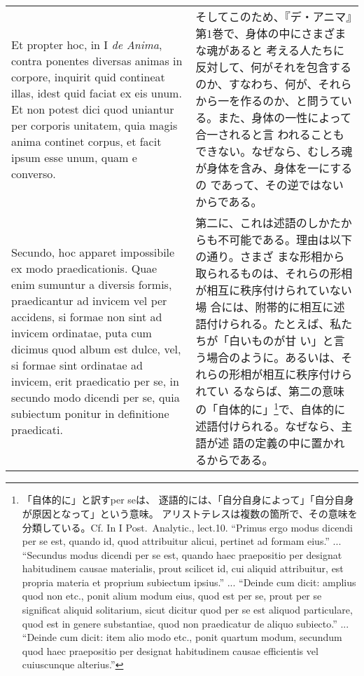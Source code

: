 \documentclass[paper=a4paper,fontsize=10pt,jafontsize=9pt,titlepage]{jlreq}
\begin{document}
\begin{longtable}{p{21em}p{21em}}
\\

 Et propter hoc, in I {\itshape de Anima}, contra ponentes diversas
animas in corpore, inquirit quid contineat illas, idest quid faciat ex
eis unum. Et non potest dici quod uniantur per corporis unitatem, quia
magis anima continet corpus, et facit ipsum esse unum, quam e
converso.

&

そしてこのため、『デ・アニマ』第1巻で、身体の中にさまざまな魂があると
考える人たちに反対して、何がそれを包含するのか、すなわち、何が、それら
から一を作るのか、と問うている。また、身体の一性によって合一されると言
われることもできない。なぜなら、むしろ魂が身体を含み、身体を一にするの
であって、その逆ではないからである。
 
\\

 Secundo, hoc apparet impossibile ex modo praedicationis. Quae enim
 sumuntur a diversis formis, praedicantur ad invicem vel per accidens,
 si formae non sint ad invicem ordinatae, puta cum dicimus quod album
 est dulce, vel, si formae sint ordinatae ad invicem, erit praedicatio
 per se, in secundo modo dicendi per se, quia subiectum ponitur in
 definitione praedicati.

&

第二に、これは述語のしかたからも不可能である。理由は以下の通り。さまざ
まな形相から取られるものは、それらの形相が相互に秩序付けられていない場
合には、附帯的に相互に述語付けられる。たとえば、私たちが「白いものが甘
い」と言う場合のように。あるいは、それらの形相が相互に秩序付けられてい
るならば、第二の意味の「自体的に」\footnote{「自体的に」と訳すper seは、
逐語的には、「自分自身によって」「自分自身が原因となって」という意味。
アリストテレスは複数の箇所で、その意味を分類している。Cf. In I
Post.~Analytic., lect.10. ``Primus ergo modus dicendi per se est,
quando id, quod attribuitur alicui, pertinet ad formam eius.'' ...
``Secundus modus dicendi per se est, quando haec praepositio per
designat habitudinem causae materialis, prout scilicet id, cui aliquid
attribuitur, est propria materia et proprium subiectum ipsius.''
... ``Deinde cum dicit: amplius quod non etc., ponit alium modum eius,
quod est per se, prout per se significat aliquid solitarium, sicut
dicitur quod per se est aliquod particulare, quod est in genere
substantiae, quod non praedicatur de aliquo subiecto.'' ... ``Deinde
cum dicit: item alio modo etc., ponit quartum modum, secundum quod
haec praepositio per designat habitudinem causae efficientis vel
cuiuscunque alterius.''}で、自体的に述語付けられる。なぜなら、主語が述
語の定義の中に置かれるからである。
 

\end{longtable}
\end{document}
